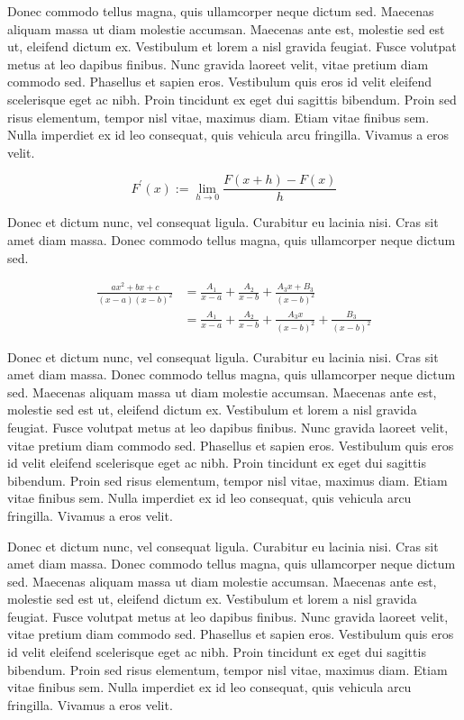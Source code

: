 Donec commodo tellus magna, quis ullamcorper neque dictum sed. Maecenas \cite{dirac} aliquam massa ut diam molestie accumsan. Maecenas ante est, molestie sed est ut, eleifend dictum ex. Vestibulum et lorem a nisl gravida feugiat. Fusce volutpat metus at leo dapibus finibus. Nunc gravida laoreet velit, vitae pretium diam \cite{Nature2017} commodo sed. Phasellus et sapien eros. Vestibulum quis eros id velit eleifend scelerisque eget ac nibh. Proin tincidunt ex eget dui sagittis bibendum. Proin sed risus elementum, tempor nisl vitae, maximus diam. Etiam vitae finibus sem. Nulla imperdiet ex id leo consequat, quis vehicula arcu fringilla. Vivamus a eros velit.

\begin{equation}\label{eq:integration}
	F^{\prime}(x) := \lim_{h \to 0}\frac{F(x+h) - F(x)}{h}
\end{equation}

Donec et dictum nunc, vel consequat ligula. Curabitur eu lacinia nisi. Cras sit amet diam massa. Donec commodo tellus magna, quis ullamcorper neque dictum sed.

\begin{align*}
\frac{ax^2+bx+c}{(x-a)(x-b)^2}
& = \frac{A_1}{x-a} + \frac{A_2}{x-b} + \frac{A_3x+B_3}{(x-b)^2}
\\
& = \frac{A_1}{x-a} + \frac{A_2}{x-b} + \frac{A_3x}{(x-b)^2} + \frac{B_3}{(x-b)^2}
\end{align*}

Donec et dictum nunc, vel consequat ligula. Curabitur eu lacinia nisi. Cras sit amet diam massa. Donec commodo tellus magna, quis ullamcorper neque dictum sed. Maecenas aliquam massa ut diam molestie accumsan. Maecenas ante est, molestie sed est ut, eleifend dictum ex. Vestibulum et lorem a nisl gravida feugiat. Fusce volutpat metus at leo dapibus finibus. Nunc gravida laoreet velit, vitae pretium diam commodo sed. Phasellus et sapien eros. Vestibulum quis eros id velit eleifend scelerisque eget ac nibh. Proin tincidunt ex eget dui sagittis bibendum. Proin sed risus elementum, tempor nisl vitae, maximus diam. Etiam vitae finibus sem. Nulla imperdiet ex id leo consequat, quis vehicula arcu fringilla. Vivamus a eros velit.


Donec et dictum nunc, vel consequat ligula. Curabitur eu lacinia nisi. Cras sit amet diam massa. Donec commodo tellus magna, quis ullamcorper neque dictum sed. Maecenas aliquam massa ut diam molestie accumsan. Maecenas ante est, molestie sed est ut, eleifend dictum ex. Vestibulum et lorem a nisl gravida feugiat. Fusce volutpat metus at leo dapibus finibus. Nunc gravida laoreet velit, vitae pretium diam commodo sed. Phasellus et sapien eros. Vestibulum quis eros id velit eleifend scelerisque eget ac nibh. Proin tincidunt ex eget dui sagittis bibendum. Proin sed risus elementum, tempor nisl vitae, maximus diam. Etiam vitae finibus sem. Nulla imperdiet ex id leo consequat, quis vehicula arcu fringilla. Vivamus a eros velit.


